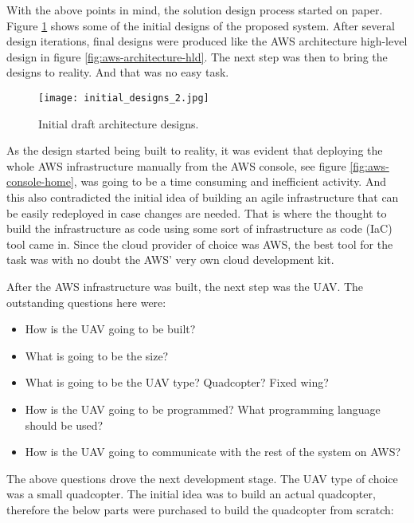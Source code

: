 With the above points in mind, the solution design process started on paper. Figure \ref{fig:initial-draft-designs} shows some of the initial designs of the proposed system. After several design iterations, final designs were produced like the AWS architecture high-level design in figure \ref{fig:aws-architecture-hld}. The next step was then to bring the designs to reality. And that was no easy task.

\begin{figure}[H]
    \centering \texttt{[image: initial\_designs\_2.jpg]}
    \caption{Initial draft architecture designs.}
    \label{fig:initial-draft-designs}
\end{figure}

As the design started being built to reality, it was evident that deploying the whole AWS infrastructure manually from the AWS console, see figure \ref{fig:aws-console-home}, was going to be a time consuming and inefficient activity. And this also contradicted the initial idea of building an agile infrastructure that can be easily redeployed in case changes are needed. That is where the thought to build the infrastructure as code using some sort of infrastructure as code (IaC) tool came in. Since the cloud provider of choice was AWS, the best tool for the task was with no doubt the AWS' very own cloud development kit\cite{awscdkdocumentation}.

After the AWS infrastructure was built, the next step was the UAV. The outstanding questions here were:

\begin{itemize}
    \item How is the UAV going to be built?
    \item What is going to be the size?
    \item What is going to be the UAV type? Quadcopter? Fixed wing?
    \item How is the UAV going to be programmed? What programming language should be used?
    \item How is the UAV going to communicate with the rest of the system on AWS?
\end{itemize}

The above questions drove the next development stage. The UAV type of choice was a small quadcopter. The initial idea was to build an actual quadcopter, therefore the below parts were purchased to build the quadcopter from scratch:

